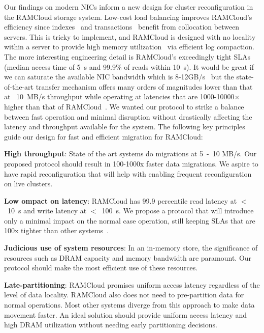 Our findings on modern NICs inform a new design for cluster reconfiguration
in the RAMCloud storage system. Low-cost load balancing improves RAMCloud's
efficiency since indexes~\cite{slik} and transactions~\cite{ramcloudtx} benefit from collocation between servers.
This is tricky to implement, and RAMCloud is designed with no locality within a 
server to provide high memory utilization~\cite{ramcloudfast} via efficient log compaction.
The more interesting engineering detail is RAMCloud's exceedingly tight SLAs (median
access time of 5~\textmu s and 99.9\% of reads within 10~\textmu s). It would be great if we can saturate the
available NIC bandwidth which is 8-12GB/s~\cite{cx3,cx4} but the state-of-the-art 
transfer mechanism offers many orders of magnitudes lower than that at ~10~MB/s 
throughput while operating at latencies that are 1000-10000$\times$ higher than that of RAMCloud~\cite{ramcloud}.
We wanted our protocol to strike a balance between fast operation and minimal disruption without drastically affecting
the latency and throughput available for the system. The following key principles guide our design for fast and 
efficient migration for RAMCloud:
\begin{myitemize}
\item{\textbf{High throughput}}: State of the art systems do migrations at 5~-~10 MB/s. Our proposed protocol
should result in 100-1000x faster data migrations. We aspire to have rapid reconfiguration that will 
help with enabling frequent reconfiguration on live clusters.
\item{\textbf{Low ompact on latency}}: RAMCloud has 99.9 percentile read latency at $<$~10~\textmu s \linebreak and write latency
at $<$~100~\textmu s. We propose a protocol that will introduce only a minimal impact on the normal case operation, still keeping
SLAs that are 100x tighter \linebreak than other systems~\cite{squall}.
\item{\textbf{Judicious use of system resources}}: In an in-memory store, the significance of \linebreak resources such as DRAM capacity and
memory bandwidth are paramount. Our \linebreak protocol should make the most efficient use of these resources.
\item{\textbf{Late-partitioning}}: RAMCloud promises uniform access latency regardless of the level of data locality.
RAMCloud also does not need to pre-partition data for normal operations. Most other systems diverge from this 
approach to make data movement faster. An ideal solution should provide uniform access latency and high DRAM utilization 
without needing early partitioning decisions.
\end{myitemize}

